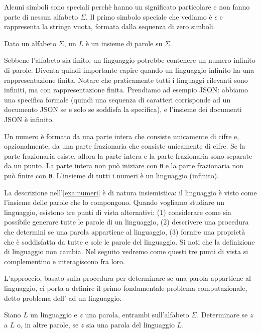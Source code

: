 Alcuni simboli sono speciali perchè hanno un significato particolare e non fanno parte di nessun alfabeto $\Sigma$.
Il primo simbolo speciale che vediamo è $\epsilon$ e rappresenta la stringa vuota,
formata dalla sequenza di zero simboli.

\begin{definition}[Linguaggio]\label{def:linguaggio}
	Dato un alfabeto $\Sigma$, un  $L$ è un insieme di parole su $\Sigma$.
\end{definition}

Sebbene l'alfabeto sia finito, un linguaggio potrebbe contenere un numero
infinito di parole.
Diventa quindi importante capire quando un linguaggio infinito ha una
rappresentazione finita.
Notare che praticamente tutti i linguaggi rilevanti sono infiniti, ma con
rappresentazione finita.
Prendiamo ad esempio JSON: abbiamo una specifica formale (quindi una sequenza di
caratteri corrisponde ad un documento JSON se e solo se soddisfa la specifica),
e l'insieme dei documenti JSON è infinito.

\begin{example}\label{exa:numeri}
	Un numero è formato da una parte intera che consiste unicamente di cifre e,
	opzionalmente, da una parte frazionaria che consiste unicamente di cifre.
	Se la parte frazionaria esiste, allora la parte intera e la parte frazionaria
	sono separate da un punto.
	La parte intera non può iniziare con \texttt{0} e la parte frazionaria non può
	finire con \texttt{0}.
	L'insieme di tutti i numeri è un linguaggio (infinito).
\end{example}

La descrizione nell'\cref{exa:numeri} è di natura insiemistica:  il
linguaggio è visto come l'insieme delle parole che lo compongono.
Quando vogliamo studiare un linguaggio, esistono tre punti di vista alternativi: (1) considerare come sia possibile generare
tutte le parole di un linguaggio, (2) descrivere una procedura che determini se
una parola appartiene al linguaggio, (3) fornire una proprietà che è soddisfatta da tutte e sole le parole del linguaggio.
Si noti che la definizione di linguaggio non cambia.
Nel seguito vedremo come questi tre punti di vista si complementino e
interagiscono fra loro.

L'approccio, basato sulla procedura per determinare se una parola
appartiene al linguaggio, ci porta a definire il primo fondamentale problema
computazionale, detto problema dell' ad un linguaggio.


\begin{problem}[Appartenenza]\label{pb:appartenenza}
Siano $L$ un linguaggio e $z$ una parola, entrambi sull'alfabeto $\Sigma$.
Determinare se $z$  a $L$ o, in altre parole, se $z$ sia una parola del linguaggio $L$.
\end{problem}

